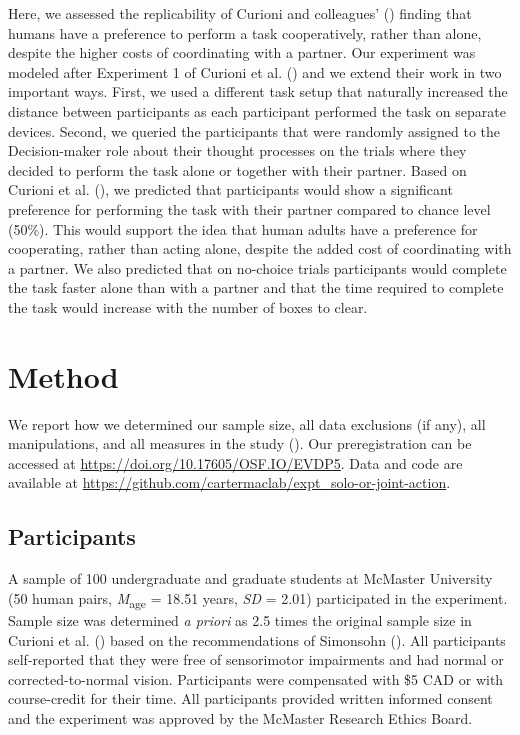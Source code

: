 \documentclass[
  man,
  floatsintext,
  longtable,
  nolmodern,
  notxfonts,
  notimes,
  colorlinks=true,linkcolor=blue,citecolor=blue,urlcolor=blue]{apa7}
\begin{document}
Here, we assessed the replicability of Curioni and colleagues'
() finding that humans have a preference
to perform a task cooperatively, rather than alone, despite the higher
costs of coordinating with a partner. Our experiment was modeled after
Experiment 1 of Curioni et al. () and we
extend their work in two important ways. First, we used a different task
setup that naturally increased the distance between participants as each
participant performed the task on separate devices. Second, we queried
the participants that were randomly assigned to the Decision-maker role
about their thought processes on the trials where they decided to
perform the task alone or together with their partner. Based on Curioni
et al. (), we predicted that
participants would show a significant preference for performing the task
with their partner compared to chance level (50\%). This would support
the idea that human adults have a preference for cooperating, rather
than acting alone, despite the added cost of coordinating with a
partner. We also predicted that on no-choice trials participants would
complete the task faster alone than with a partner and that the time
required to complete the task would increase with the number of boxes to
clear.

\section{Method}\label{method}

We report how we determined our sample size, all data exclusions (if
any), all manipulations, and all measures in the study
(). Our preregistration
can be accessed at \url{https://doi.org/10.17605/OSF.IO/EVDP5}. Data and
code are available at
\url{https://github.com/cartermaclab/expt_solo-or-joint-action}.

\subsection{Participants}\label{participants}

A sample of 100 undergraduate and graduate students at McMaster
University (50 human pairs, \emph{M}\textsubscript{age} = 18.51 years,
\emph{SD} = 2.01) participated in the experiment. Sample size was
determined \emph{a priori} as 2.5 times the original sample size in
Curioni et al. () based on the
recommendations of Simonsohn (). All
participants self-reported that they were free of sensorimotor
impairments and had normal or corrected-to-normal vision. Participants
were compensated with \$5 CAD or with course-credit for their time. All
participants provided written informed consent and the experiment was
approved by the McMaster Research Ethics Board.
\end{document}
